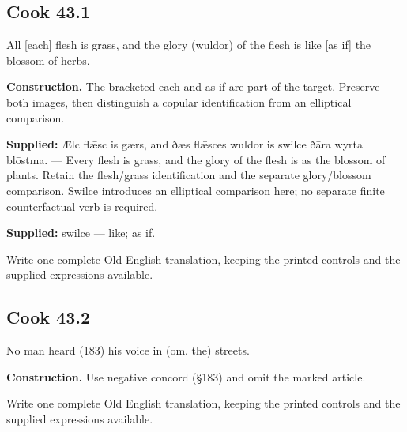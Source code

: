 \par\begin{minipage}{\linewidth}\raggedright
\subsection*{Cook 43.1}

All [each] flesh is grass, and the glory (wuldor) of the flesh is like [as if] the blossom of herbs.

\end{minipage}\par\addvspace{4pt}

\textbf{Construction.} The bracketed each and as if are part of the target. Preserve both images, then distinguish a copular identification from an elliptical comparison.

\textbf{Supplied:} Ǣlc flǣsc is gærs, and ðæs flǣsces wuldor is swilce ðāra wyrta blōstma. — Every flesh is grass, and the glory of the flesh is as the blossom of plants. Retain the flesh/\allowbreak{}grass identification and the separate glory/\allowbreak{}blossom comparison. Swilce introduces an elliptical comparison here; no separate finite counterfactual verb is required.

\textbf{Supplied:} swilce — like; as if.

Write one complete Old English translation, keeping the printed controls and the supplied expressions available.

\par\begin{minipage}{\linewidth}\raggedright
\subsection*{Cook 43.2}

No man heard (183) his voice in (om. the) streets.

\textbf{Construction.} Use negative concord (§183) and omit the marked article.

Write one complete Old English translation, keeping the printed controls and the supplied expressions available.

\end{minipage}\par\addvspace{4pt}

